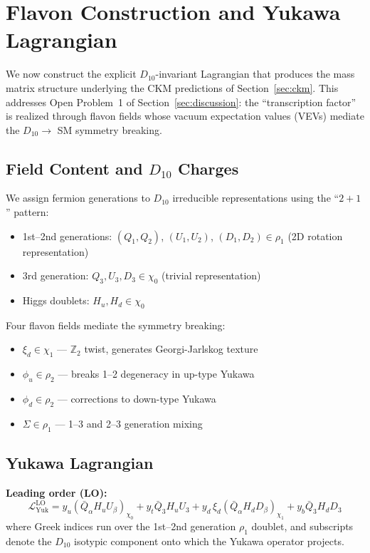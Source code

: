\documentclass[11pt,a4paper]{article}
\begin{document}
\section{Flavon Construction and Yukawa Lagrangian}
\label{sec:flavon}

We now construct the explicit $D_{10}$-invariant Lagrangian that produces the mass matrix structure underlying the CKM predictions of Section~\ref{sec:ckm}. This addresses Open Problem~1 of Section~\ref{sec:discussion}: the ``transcription factor'' is realized through flavon fields whose vacuum expectation values (VEVs) mediate the $D_{10} \to$ SM symmetry breaking.

\subsection{Field Content and $D_{10}$ Charges}

We assign fermion generations to $D_{10}$ irreducible representations using the ``$2+1$'' pattern:
\begin{itemize}
\item 1st--2nd generations: $(Q_1, Q_2)$, $(U_1, U_2)$, $(D_1, D_2) \in \rho_1$ (2D rotation representation)
\item 3rd generation: $Q_3, U_3, D_3 \in \chi_0$ (trivial representation)
\item Higgs doublets: $H_u, H_d \in \chi_0$
\end{itemize}

Four flavon fields mediate the symmetry breaking:
\begin{itemize}
\item $\xi_d \in \chi_1$ --- $\mathbb{Z}_2$ twist, generates Georgi-Jarlskog texture
\item $\phi_u \in \rho_2$ --- breaks 1--2 degeneracy in up-type Yukawa
\item $\phi_d \in \rho_2$ --- corrections to down-type Yukawa
\item $\Sigma \in \rho_1$ --- 1--3 and 2--3 generation mixing
\end{itemize}

\subsection{Yukawa Lagrangian}

\textbf{Leading order (LO):}
\begin{equation}
\mathcal{L}_{\text{Yuk}}^{\text{LO}} = y_u (\bar{Q}_\alpha H_u U_\beta)_{\chi_0} + y_t \bar{Q}_3 H_u U_3 + y_d \, \xi_d (\bar{Q}_\alpha H_d D_\beta)_{\chi_1} + y_b \bar{Q}_3 H_d D_3
\end{equation}
where Greek indices run over the 1st--2nd generation $\rho_1$ doublet, and subscripts denote the $D_{10}$ isotypic component onto which the Yukawa operator projects.
\end{document}

